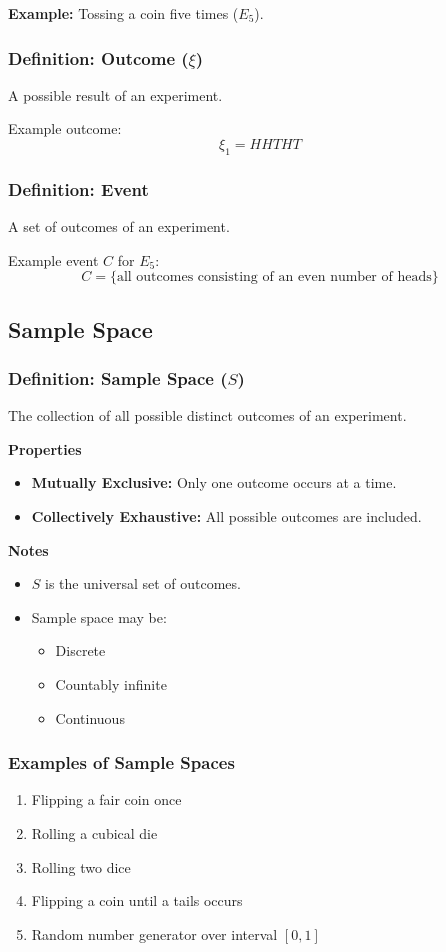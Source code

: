 \documentclass[12pt]{article}
\begin{document}
\textbf{Example:} Tossing a coin five times ($E_5$).

\subsubsection*{Definition: Outcome ($\xi$)}
A possible result of an experiment.

Example outcome:
\[
\xi_1 = HHTHT
\]

\subsubsection*{Definition: Event}
A set of outcomes of an experiment.

Example event $C$ for $E_5$:
\[
C = \{\text{all outcomes consisting of an even number of heads}\}
\]


\subsection{Sample Space}

\subsubsection*{Definition: Sample Space ($S$)}
The collection of all possible distinct outcomes of an experiment.

\textbf{Properties}
\begin{itemize}
\item \textbf{Mutually Exclusive:} Only one outcome occurs at a time.
\item \textbf{Collectively Exhaustive:} All possible outcomes are included.
\end{itemize}

\textbf{Notes}
\begin{itemize}
\item $S$ is the universal set of outcomes.
\item Sample space may be:
\begin{itemize}
\item Discrete
\item Countably infinite
\item Continuous
\end{itemize}
\end{itemize}

\subsubsection*{Examples of Sample Spaces}
\begin{enumerate}
\item Flipping a fair coin once
\item Rolling a cubical die
\item Rolling two dice
\item Flipping a coin until a tails occurs
\item Random number generator over interval $[0,1]$
\end{enumerate}
\end{document}
